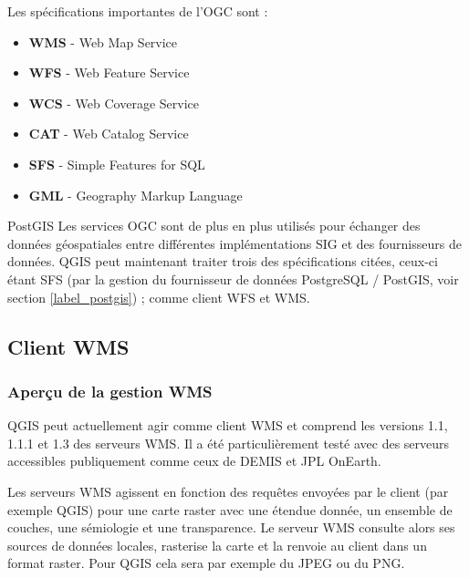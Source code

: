 Les spécifications importantes de l'OGC sont :

\begin{itemize}
\item \textbf{WMS} - Web Map Service
\item \textbf{WFS} - Web Feature Service
\item \textbf{WCS} - Web Coverage Service
\item \textbf{CAT} - Web Catalog Service
\item \textbf{SFS} - Simple Features for SQL
\item \textbf{GML} - Geography Markup Language
\end{itemize}

PostGIS
Les services OGC sont de plus en plus utilisés pour échanger des données
géospatiales entre différentes implémentations SIG et des fournisseurs de
données. QGIS peut maintenant traiter trois des spécifications citées, ceux-ci
étant SFS (par la gestion du fournisseur de données PostgreSQL / PostGIS, voir
section \ref{label_postgis}) ; comme client WFS et WMS.

\subsection{Client
WMS}\label{sec:ogc-wms}

\subsubsection{Aperçu de la gestion
WMS}\label{sec:ogc-wms-about}

QGIS peut actuellement agir comme client WMS et comprend les versions 1.1, 1.1.1
et 1.3 des serveurs WMS. Il a été particulièrement testé avec des serveurs
accessibles publiquement comme ceux de DEMIS et JPL OnEarth.

Les serveurs WMS agissent en fonction des requêtes envoyées par le client (par
exemple QGIS) pour une carte raster avec une étendue donnée, un ensemble de
couches, une sémiologie et une transparence. Le serveur WMS consulte alors ses
sources de données locales, rasterise la carte et la renvoie au client dans un
format raster. Pour QGIS cela sera par exemple du JPEG ou du PNG.

